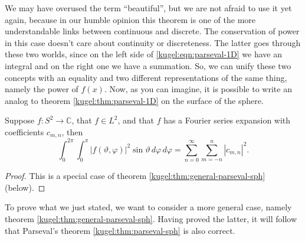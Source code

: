We may have overused the term ``beautiful'', but we are not afraid to use it yet
again, because in our humble opinion this theorem is one of the more
understandable links between continuous and discrete. The conservation of power
in this case doesn't care about continuity or discreteness. The latter goes
through these two worlds, since on the left side of
\eqref{kugel:eqn:parseval-1D} we have an integral and on the right one we have a
summation. So, we can unify these two concepts with an equality and two
different representations of the same thing, namely the power of $f(x)$.  Now,
as you can imagine, it is possible to write an analog to theorem
\ref{kugel:thm:parseval-1D} on the surface of the sphere.

\begin{theorem}
  \label{kugel:thm:parseval-sph}
  Suppose $f: S^2 \to \mathbb{C}$, that $f \in L^2$, and that $f$ has a Fourier
  series expansion with coefficients $c_{m,n}$, then
  \begin{equation}
    \label{kugel:eqn:parseval-sph}
    \int_0^{2\pi}\int_0^\pi |f(\vartheta, \varphi)|^2
      \sin\vartheta \, d\varphi \, d\varphi
    = \sum_{n=0}^\infty \sum_{m=-n}^n |c_{m,n}|^2.
  \end{equation}
\end{theorem}
\begin{proof}
  This is a special case of theorem \ref{kugel:thm:general-parseval-sph} (below).
\end{proof}

To prove what we just stated, we want to consider a more general case, namely
theorem \ref{kugel:thm:general-parseval-sph}.  Having proved the latter, it will
follow that Parseval's theorem \ref{kugel:thm:parseval-sph} is also correct.

